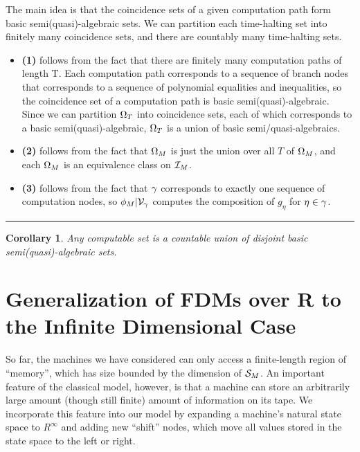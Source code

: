 \documentclass[twoside]{article}
\newtheorem{corollary}{Corollary}[section]
\newenvironment{proofsketch}{{\bf Proof Sketch:}}{\hfill\rule{2mm}{2mm}}
\begin{document}
  \begin{proofsketch}
    
    The main idea is that the coincidence sets of a given computation
    path form basic semi(quasi)-algebraic sets.  We can partition
    each time-halting set into finitely many coincidence sets, and
    there are countably many time-halting sets.

    \begin{itemize}
    \item \textbf{(1)} follows from the fact that there are finitely
      many computation paths of length T.  Each computation path
      corresponds to a sequence of branch nodes that corresponds to a
      sequence of polynomial equalities and inequalities, so the
      coincidence set of a computation path is basic
      semi(quasi)-algebraic. Since we can partition $\Omega_T$ into
      coincidence sets, each of which corresponds to a basic
      semi(quasi)-algebraic, $\Omega_T$ is a union of basic
      semi/quasi-algebraics.
    \item \textbf{(2)} follows from the fact that $\Omega_M$ is just
      the union over all $T$ of $\Omega_M$, and each $\Omega_M$ is
      an equivalence class on $\mathcal{I}_M$.
    \item \textbf{(3)} follows from the fact that $\gamma$
      corresponds to exactly one sequence of computation nodes, so
      $\phi_M|\mathcal{V}_{\gamma}$ computes the composition of
      $g_{\eta}$ for $\eta \in \gamma$.
    \end{itemize}
  \end{proofsketch}
  
  \begin{corollary}
    Any computable set is a countable union of disjoint basic
    semi(quasi)-algebraic sets.
  \end{corollary}

  \section{Generalization of FDMs over R to the Infinite Dimensional Case}

  So far, the machines we have considered can only access a
  finite-length region of ``memory'', which has size bounded by the
  dimension of $\mathcal{S}_M$.  An important feature of the classical
  model, however, is that a machine can store an arbitrarily large
  amount (though still finite) amount of information on its tape.  We
  incorporate this feature into our model by expanding a machine's
  natural state space to $R^\infty$ and adding new ``shift'' nodes,
  which move all values stored in the state space to the left
  or right.
\end{document}
